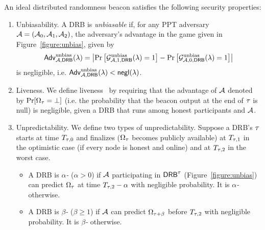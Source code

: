 \begin{definition}
An ideal distributed randomness beacon satisfies the following security properties:
\begin{enumerate}
\item Unbiasability.
A DRB is \textit{unbiasable} if, for any PPT adversary $\mathcal{A} = (\mathcal{A}_0, \mathcal{A}_1, \mathcal{A}_2)$, the adversary's advantage in the game given in Figure~\ref{figure:unbias}, given by
\begingroup\makeatletter\def\f@size{8}\check@mathfonts
\begin{equation*}
\mathsf{Adv}^\text{unbias}_{\mathcal{A}, \mathsf{DRB}}(\lambda) = \left|\Pr\left[\mathcal{G}^\text{unbias}_{\mathcal{A}, 1, \mathsf{DRB}}(\lambda) = 1\right] - \Pr\left[\mathcal{G}^\text{unbias}_{\mathcal{A}, 0, \mathsf{DRB}}(\lambda) = 1\right]\right|
\end{equation*}\endgroup
is negligible, i.e. $\mathsf{Adv}^\text{unbias}_{\mathcal{A}, \mathsf{DRB}}(\lambda) < \mathsf{negl}(\lambda)$.

\item Liveness. We define liveness~\cite{cherniaeva2019homomorphic} by requiring that the advantage of $\mathcal{A}$ denoted by $\Pr[\Omega_\tau = \text{$\perp$}]$ (i.e. the probability that the beacon output at the end of \epoch $\tau$ is null) is negligible, given a DRB that runs among honest participants and $\mathcal{A}$.

\item Unpredictability.
We define two types of unpredictability.
Suppose a DRB's \epoch $\tau$ starts at time $T_{\tau, 0}$ and finalizes ($\Omega_\tau$ becomes publicly available) at $T_{\tau, 1}$ in the optimistic case (if every node is honest and online) and at $T_{\tau, 2}$ in the worst case.
\begin{itemize}
\item A DRB is \textit{$\alpha$-\intraunpredictable} ($\alpha > 0$) if $\mathcal{A}$ participating in $\mathsf{DRB}^\tau$ (Figure~\ref{figure:unbias}) can predict $\Omega_\tau$ at time $T_{\tau, 2} - \alpha$ with negligible probability.
It is \textit{$\alpha$-\intrapredictable} otherwise.
\item A DRB is \textit{$\beta$-\interunpredictable} ($\beta \geq 1$) if $\mathcal{A}$ can predict $\Omega_{\tau + \beta}$ before $T_{\tau, 2}$ with negligible probability.
It is \textit{$\beta$-\interpredictable} otherwise.
\end{itemize}
\end{enumerate}
\end{definition}

